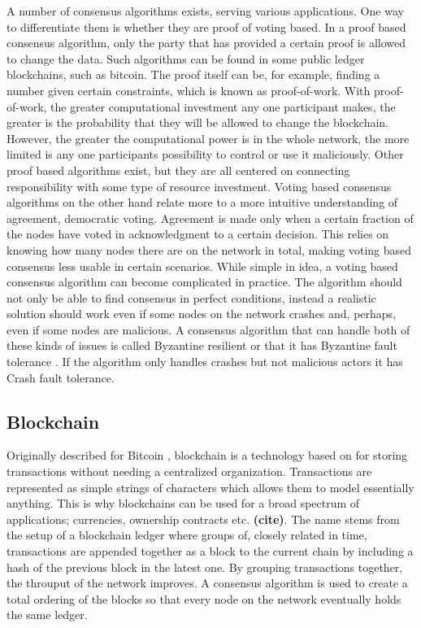 \documentclass[english, biblatex, digitaloutput]{kththesis}
\begin{document}
A number of consensus algorithms exists, serving various applications. One way to differentiate them is whether they are proof of voting based. In a proof based consensus algorithm, only the party that has provided a certain proof is allowed to change the data. Such algorithms can be found in some public ledger blockchains, such as bitcoin. The proof itself can be, for example, finding a number given certain constraints, which is known as proof-of-work. With proof-of-work, the greater computational investment any one participant makes, the greater is the probability that they will be allowed to change the blockchain. However, the greater the computational power is in the whole network, the more limited is any one participants possibility to control or use it maliciously. Other proof based algorithms exist, but they are all centered on connecting responsibility with some type of resource investment. Voting based consensus algorithms on the other hand relate more to a more intuitive understanding of agreement, \ie democratic voting. Agreement is made only when a certain fraction of the nodes have voted in acknowledgment to a certain decision. This relies on knowing how many nodes there are on the network in total, making voting based consensus less usable in certain scenarios. While simple in idea, a voting based consensus algorithm can become complicated in practice. The algorithm should not only be able to find consensus in perfect conditions, instead a realistic solution should work even if some nodes on the network crashes and, perhaps, even if some nodes are malicious. A consensus algorithm that can handle both of these kinds of issues is called Byzantine resilient \cite{goos_consensus_1983} or that it has Byzantine fault tolerance \cite{nguyen_survey_2018}. If the algorithm only handles crashes but not malicious actors it has Crash fault tolerance.


\subsection{Blockchain}

Originally described for Bitcoin \cite{nakamoto_bitcoin_nodate, di_pierro_what_2017}, blockchain is a technology based on  for storing transactions without needing a centralized organization. Transactions are represented as simple strings of characters which allows them to model essentially anything. This is why blockchains can be used for a broad spectrum of applications; \eg currencies, ownership contracts etc. \textbf{(cite)}. The name stems from the setup of a blockchain ledger where groups of, closely related in time, transactions are appended together as a block to the current chain by including a hash of the previous block in the latest one. By grouping transactions together, the throuput of the network improves. A consensus algorithm is used to create a total ordering of the blocks so that every node on the network eventually holds the same ledger.
\end{document}
